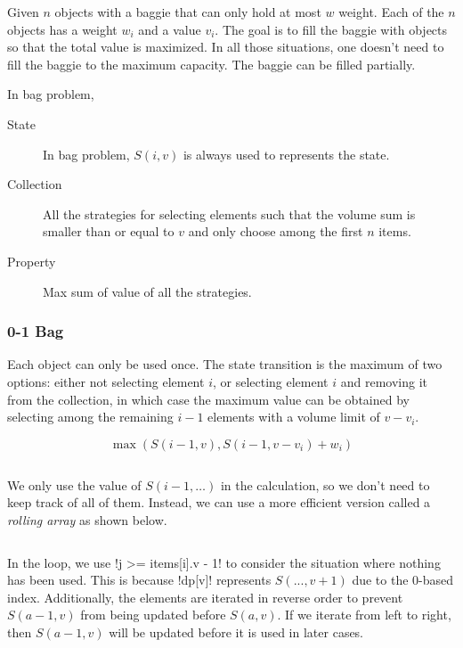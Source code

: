 \documentclass{article}
\begin{document}
Given $n$ objects with a baggie that can only hold at most $w$ weight. Each of the $n$ objects has a weight $w_i$ and a value $v_i$. The goal is to fill the baggie with objects so that the total value is maximized. In all those situations, one doesn't need to fill the baggie to the maximum capacity. The baggie can be filled partially.

In bag problem,

\begin{description}
	\item[State] In bag problem, $S(i, v)$ is always used to represents the state.
	\item[Collection] All the strategies for selecting elements such that the volume sum is smaller than or equal to $v$ and only choose among the first $n$ items.
	\item[Property] Max sum of value of all the strategies.
\end{description}

\subsubsection{0-1 Bag}

Each object can only be used once. The state transition is the maximum of two options: either not selecting element $i$, or selecting element $i$ and removing it from the collection, in which case the maximum value can be obtained by selecting among the remaining $i - 1$ elements with a volume limit of $v - v_i$.

\[
	\max(S(i - 1, v), S(i - 1, v - v_i) + w_i)
\]

\begin{center}
	\inputminted{cpp}{src/struct-0-1-rudimentary-bag.cpp}%
\end{center}

We only use the value of $S(i - 1, \ldots)$ in the calculation, so we don't need to keep track of all of them. Instead, we can use a more efficient version called a \emph{rolling array} as shown below.

\begin{center}
	\inputminted[firstline=21, lastline=27]{cpp}{src/struct-0-1-bag.cpp}
\end{center}

In the loop, we use \mono!j >= items[i].v - 1! to consider the situation where nothing has been used. This is because \mono!dp[v]! represents $S(..., v + 1)$ due to the 0-based index. Additionally, the elements are iterated in reverse order to prevent $S(a-1,v)$ from being updated before $S(a,v)$. If we iterate from left to right, then $S(a-1,v)$ will be updated before it is used in later cases.
\end{document}
